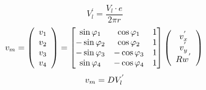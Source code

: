 \documentclass[twocolumn,10pt]{amrob}
\begin{document}
\begin{equation}
  V_{l}^{'} = \frac{ V_l \cdot e } { 2 \pi r} \label{eq:reductorPerim}
\end{equation}
\begin{equation}
  v_m = 
    \left(\begin{array}{c}
      v_1 \\ v_2 \\ v_3 \\ v_4 
    \end{array}\right)
    = 
    \begin{bmatrix}
      \sin\varphi_1 & \cos\varphi_1 & 1 \\
      -\sin\varphi_2 & \cos\varphi_2 & 1 \\
      -\sin\varphi_3 & -\cos\varphi_3 & 1 \\
      \sin\varphi_4 & -\cos\varphi_4 & 1 \\
    \end{bmatrix}
    \left(\begin{array}{c}
      v_x^{'}  \\ v_y^{'}  \\ {Rw}^{'} 
    \end{array} \right) \label{eq:velsMots} \\
\end{equation}
\begin{equation}
    v_m = D V_{l}^{'} \label{eq:velsMotsReduce} \\
\end{equation}
\par


\end{document}
